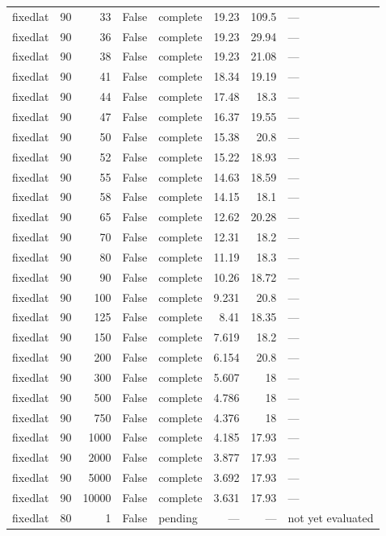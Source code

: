 \begin{tabular}{lrrrlrrl}
fixedlat & 90 & 33 & False & complete & 19.23 & 109.5 & — \\
fixedlat & 90 & 36 & False & complete & 19.23 & 29.94 & — \\
fixedlat & 90 & 38 & False & complete & 19.23 & 21.08 & — \\
fixedlat & 90 & 41 & False & complete & 18.34 & 19.19 & — \\
fixedlat & 90 & 44 & False & complete & 17.48 & 18.3 & — \\
fixedlat & 90 & 47 & False & complete & 16.37 & 19.55 & — \\
fixedlat & 90 & 50 & False & complete & 15.38 & 20.8 & — \\
fixedlat & 90 & 52 & False & complete & 15.22 & 18.93 & — \\
fixedlat & 90 & 55 & False & complete & 14.63 & 18.59 & — \\
fixedlat & 90 & 58 & False & complete & 14.15 & 18.1 & — \\
fixedlat & 90 & 65 & False & complete & 12.62 & 20.28 & — \\
fixedlat & 90 & 70 & False & complete & 12.31 & 18.2 & — \\
fixedlat & 90 & 80 & False & complete & 11.19 & 18.3 & — \\
fixedlat & 90 & 90 & False & complete & 10.26 & 18.72 & — \\
fixedlat & 90 & 100 & False & complete & 9.231 & 20.8 & — \\
fixedlat & 90 & 125 & False & complete & 8.41 & 18.35 & — \\
fixedlat & 90 & 150 & False & complete & 7.619 & 18.2 & — \\
fixedlat & 90 & 200 & False & complete & 6.154 & 20.8 & — \\
fixedlat & 90 & 300 & False & complete & 5.607 & 18 & — \\
fixedlat & 90 & 500 & False & complete & 4.786 & 18 & — \\
fixedlat & 90 & 750 & False & complete & 4.376 & 18 & — \\
fixedlat & 90 & 1000 & False & complete & 4.185 & 17.93 & — \\
fixedlat & 90 & 2000 & False & complete & 3.877 & 17.93 & — \\
fixedlat & 90 & 5000 & False & complete & 3.692 & 17.93 & — \\
fixedlat & 90 & 10000 & False & complete & 3.631 & 17.93 & — \\
fixedlat & 80 & 1 & False & pending & — & — & not yet evaluated \\

\end{tabular}
